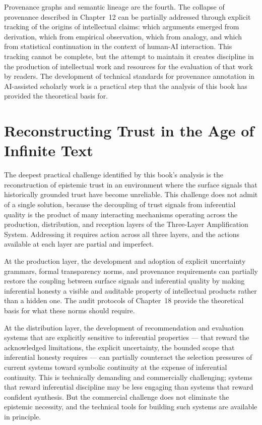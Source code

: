 \documentclass[12pt, openright, twoside]{book}
\begin{document}
Provenance graphs and semantic lineage are the fourth. The collapse
of provenance described in Chapter~12 can be partially addressed through
explicit tracking of the origins of intellectual claims: which arguments
emerged from derivation, which from empirical observation, which from
analogy, and which from statistical continuation in the context of
human-AI interaction. This tracking cannot be complete, but the attempt
to maintain it creates discipline in the production of intellectual work
and resources for the evaluation of that work by readers. The development
of technical standards for provenance annotation in AI-assisted scholarly
work is a practical step that the analysis of this book has provided
the theoretical basis for.

\section{Reconstructing Trust in the Age of Infinite Text}

The deepest practical challenge identified by this book's analysis is
the reconstruction of epistemic trust in an environment where the surface
signals that historically grounded trust have become unreliable. This
challenge does not admit of a single solution, because the decoupling
of trust signals from inferential quality is the product of many
interacting mechanisms operating across the production, distribution,
and reception layers of the Three-Layer Amplification System. Addressing
it requires action across all three layers, and the actions available
at each layer are partial and imperfect.

At the production layer, the development and adoption of explicit
uncertainty grammars, formal transparency norms, and provenance
requirements can partially restore the coupling between surface signals
and inferential quality by making inferential honesty a visible and
auditable property of intellectual products rather than a hidden
one. The audit protocols of Chapter~18 provide the theoretical basis
for what these norms should require.

At the distribution layer, the development of recommendation and
evaluation systems that are explicitly sensitive to inferential
properties --- that reward the acknowledged limitations, the explicit
uncertainty, the bounded scope that inferential honesty requires ---
can partially counteract the selection pressures of current systems
toward symbolic continuity at the expense of inferential continuity.
This is technically demanding and commercially challenging; systems
that reward inferential discipline may be less engaging than systems
that reward confident synthesis. But the commercial challenge does not
eliminate the epistemic necessity, and the technical tools for building
such systems are available in principle.
\end{document}
